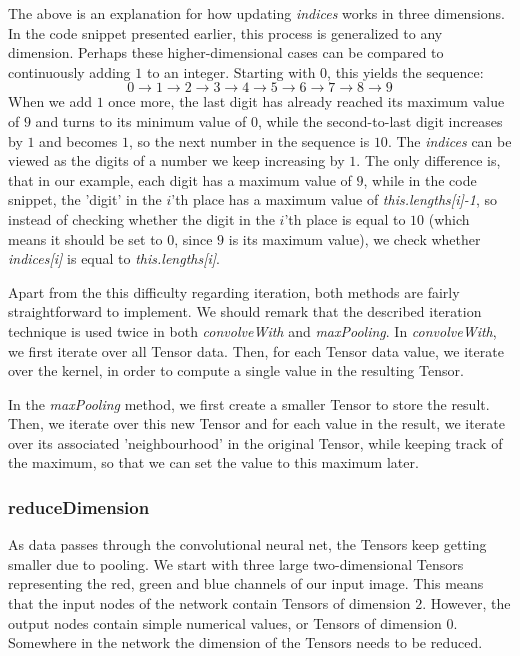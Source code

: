 \documentclass[12pt, titlepage]{article}
\begin{document}
    The above is an explanation for how updating \textit{indices} works in three dimensions. In the code snippet presented earlier, this process is generalized to any dimension. Perhaps these higher-dimensional cases can be compared to continuously adding $1$ to an integer. Starting with $0$, this yields the sequence:
    \begin{equation*}
    0\to1\to 2\to 3\to 4\to 5\to 6\to 7\to 8\to 9
    \end{equation*}
    When we add $1$ once more, the last digit has already reached its maximum value of $9$ and turns to its minimum value of $0$, while the second-to-last digit increases by $1$ and becomes $1$, so the next number in the sequence is $10$. The \textit{indices} can be viewed as the digits of a number we keep increasing by $1$. The only difference is, that in our example, each digit has a maximum value of $9$, while in the code snippet, the 'digit' in the $i$'th place has a maximum value of \textit{this.lengths[i]-1}, so instead of checking whether the digit in the $i$'th place is equal to $10$ (which means it should be set to $0$, since $9$ is its maximum value), we check whether \textit{indices[i]} is equal to \textit{this.lengths[i]}.
    
    Apart from the this difficulty regarding iteration, both methods are fairly straightforward to implement. We should remark that the described iteration technique is used twice in both \textit{convolveWith} and \textit{maxPooling}. In \textit{convolveWith}, we first iterate over all Tensor data. Then, for each Tensor data value, we iterate over the kernel, in order to compute a single value in the resulting Tensor.
    
    In the \textit{maxPooling} method, we first create a smaller Tensor to store the result. Then, we iterate over this new Tensor and for each value in the result, we iterate over its associated 'neighbourhood' in the original Tensor, while keeping track of the maximum, so that we can set the value to this maximum later.
    
    \subsubsection{reduceDimension}
    As data passes through the convolutional neural net, the Tensors keep getting smaller due to pooling. We start with three large two-dimensional Tensors representing the red, green and blue channels of our input image. This means that the input nodes of the network contain Tensors of dimension $2$. However, the output nodes contain simple numerical values, or Tensors of dimension $0$. Somewhere in the network the dimension of the Tensors needs to be reduced.
    
\end{document}
